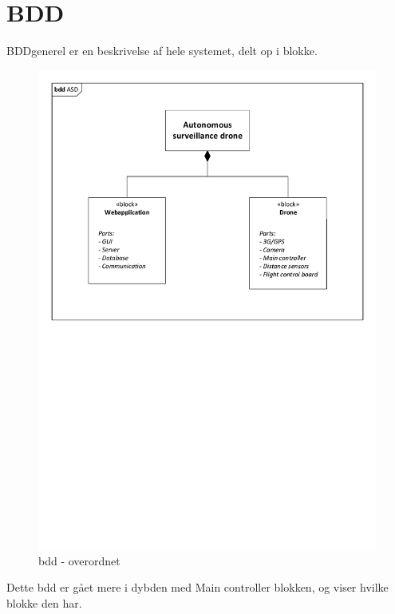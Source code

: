 \section{BDD}

BDD\textunderscore generel er en beskrivelse af hele systemet, delt op i blokke.


\begin{figure}[H]
\centering
\includegraphics[width=1\textwidth]{Billeder/BDD/bdd_overordnet.pdf}
\caption{bdd - overordnet}
\label{fig:bdd_overordnet}
\end{figure}

Dette bdd er gået mere i dybden med Main controller blokken, og viser hvilke blokke den har.

